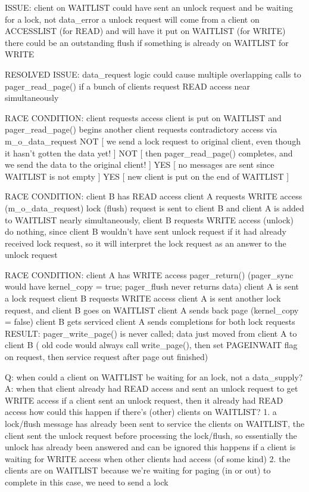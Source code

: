 \documentclass{article}
\begin{document}
ISSUE:
  client on WAITLIST could have sent an unlock request and be waiting for a lock, not data_error
  a unlock request will come from a client on ACCESSLIST (for READ) and will have it put on WAITLIST (for WRITE)
  there could be an outstanding flush if something is already on WAITLIST for WRITE

RESOLVED ISSUE:
  data_request logic could cause multiple overlapping calls to pager_read_page() if a bunch of clients
    request READ access near simultaneously

RACE CONDITION:
  client requests access
  client is put on WAITLIST and pager_read_page() begins
  another client requests contradictory access via m_o_data_request
  NOT [ we send a lock request to original client, even though it hasn't gotten the data yet! ]
  NOT [ then pager_read_page() completes, and we send the data to the original client! ]
  YES [ no messages are sent since WAITLIST is not empty ]
  YES [ new client is put on the end of WAITLIST ]

RACE CONDITION:
  client B has READ access
  client A requests WRITE access (m_o_data_request)
  lock (flush) request is sent to client B and client A is added to WAITLIST
  nearly simultaneously, client B requests WRITE access (unlock)
  do nothing, since client B wouldn't have sent unlock request if it had already received lock request,
    so it will interpret the lock request as an answer to the unlock request

RACE CONDITION:
  client A has WRITE access
  pager_return()  (pager_sync would have kernel_copy = true; pager_flush never returns data)
  client A is sent a lock request
  client B requests WRITE access
  client A is sent another lock request, and client B goes on WAITLIST
  client A sends back page (kernel_copy = false)
  client B gets serviced
  client A sends completions for both lock requests
  RESULT: pager_write_page() is never called; data just moved from client A to client B
  ( old code would always call write_page(), then set PAGEINWAIT flag on request, then service request after page out finished)


Q: when could a client on WAITLIST be waiting for an lock, not a data_supply?
A: when that client already had READ access and sent an unlock request to get WRITE access
  if a client sent an unlock request, then it already had READ access
  how could this happen if there's (other) clients on WAITLIST?
  1. a lock/flush message has already been sent to service the clients on WAITLIST,
       the client sent the unlock request before processing the lock/flush,
       so essentially the unlock has already been answered and can be ignored
     this happens if a client is waiting for WRITE access when other clients had access (of some kind)
  2. the clients are on WAITLIST because we're waiting for paging (in or out) to complete
     in this case, we need to send a lock
\end{document}
